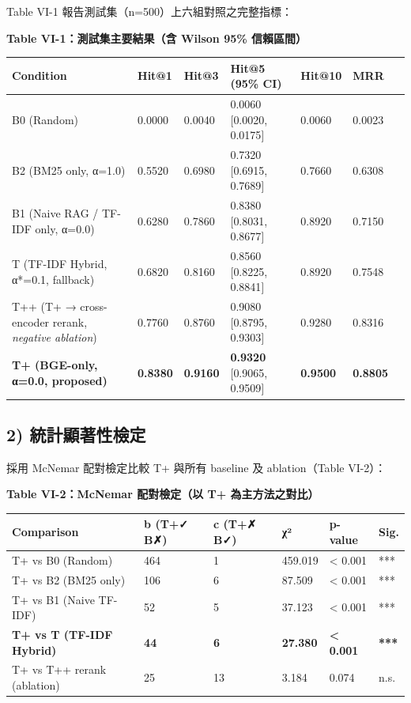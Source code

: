 Table VI-1 報告測試集（n=500）上六組對照之完整指標：

\textbf{Table VI-1：測試集主要結果（含 Wilson 95\% 信賴區間）}

\begin{longtable}[]{@{}p{}llllll@{}}
\toprule\noalign{}
Condition & Hit@1 & Hit@3 & Hit@5 (95\% CI) & Hit@10 & MRR \\
\midrule\noalign{}
\endhead
\bottomrule\noalign{}
\endlastfoot
B0 (Random) & 0.0000 & 0.0040 & 0.0060 {[}0.0020, 0.0175{]} & 0.0060 & 0.0023 \\
B2 (BM25 only, α=1.0) & 0.5520 & 0.6980 & 0.7320 {[}0.6915, 0.7689{]} & 0.7660 & 0.6308 \\
B1 (Naive RAG / TF-IDF only, α=0.0) & 0.6280 & 0.7860 & 0.8380 {[}0.8031, 0.8677{]} & 0.8920 & 0.7150 \\
T (TF-IDF Hybrid, α*=0.1, fallback) & 0.6820 & 0.8160 & 0.8560 {[}0.8225, 0.8841{]} & 0.8920 & 0.7548 \\
T++ (T+ → cross-encoder rerank, \emph{negative ablation}) & 0.7760 & 0.8760 & 0.9080 {[}0.8795, 0.9303{]} & 0.9280 & 0.8316 \\
\textbf{T+ (BGE-only, α=0.0, proposed)} & \textbf{0.8380} & \textbf{0.9160} & \textbf{0.9320} {[}0.9065, 0.9509{]} & \textbf{0.9500} & \textbf{0.8805} \\
\end{longtable}

\subsection{2) 統計顯著性檢定}\label{ux7d71ux8a08ux986fux8457ux6027}

採用 McNemar 配對檢定比較 T+ 與所有 baseline 及 ablation（Table VI-2）：

\textbf{Table VI-2：McNemar 配對檢定（以 T+ 為主方法之對比）}

\begin{longtable}[]{@{}llllll@{}}
\toprule\noalign{}
Comparison & b (T+✓ B✗) & c (T+✗ B✓) & χ² & p-value & Sig. \\
\midrule\noalign{}
\endhead
\bottomrule\noalign{}
\endlastfoot
T+ vs B0 (Random) & 464 & 1 & 459.019 & < 0.001 & *** \\
T+ vs B2 (BM25 only) & 106 & 6 & 87.509 & < 0.001 & *** \\
T+ vs B1 (Naive TF-IDF) & 52 & 5 & 37.123 & < 0.001 & *** \\
\textbf{T+ vs T (TF-IDF Hybrid)} & \textbf{44} & \textbf{6} & \textbf{27.380} & \textbf{< 0.001} & \textbf{***} \\
T+ vs T++ rerank (ablation) & 25 & 13 & 3.184 & 0.074 & n.s. \\
\end{longtable}

